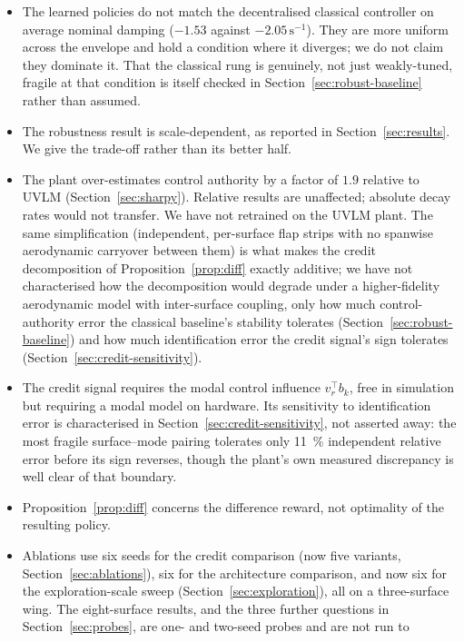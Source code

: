 \documentclass[preprint,11pt,authoryear]{elsarticle}
\begin{document}
\begin{itemize}
\item The learned policies do not match the decentralised classical controller on
average nominal damping ($-1.53$ against $-2.05\,\mathrm{s}^{-1}$). They are more
uniform across the envelope and hold a condition where it diverges; we do not
claim they dominate it. That the classical rung is genuinely, not just
weakly-tuned, fragile at that condition is itself checked in
Section~\ref{sec:robust-baseline} rather than assumed.
\item The robustness result is scale-dependent, as reported in
Section~\ref{sec:results}. We give the trade-off rather than its better half.
\item The plant over-estimates control authority by a factor of $1.9$ relative to
UVLM (Section~\ref{sec:sharpy}). Relative results are unaffected; absolute decay
rates would not transfer. We have not retrained on the UVLM plant. The same
simplification (independent, per-surface flap strips with no spanwise
aerodynamic carryover between them) is what makes the credit decomposition of
Proposition~\ref{prop:diff} exactly additive; we have not characterised how the
decomposition would degrade under a higher-fidelity aerodynamic model with
inter-surface coupling, only how much control-authority error the classical
baseline's stability tolerates (Section~\ref{sec:robust-baseline}) and how much
identification error the credit signal's sign tolerates
(Section~\ref{sec:credit-sensitivity}).
\item The credit signal requires the modal control influence $v_r^{\top} b_k$,
free in simulation but requiring a modal model on hardware. Its sensitivity to
identification error is characterised in Section~\ref{sec:credit-sensitivity},
not asserted away: the most fragile surface--mode pairing tolerates only
\SI{11}{\percent} independent relative error before its sign reverses, though
the plant's own measured discrepancy is well clear of that boundary.
\item Proposition~\ref{prop:diff} concerns the difference reward, not optimality
of the resulting policy.
\item Ablations use six seeds for the credit comparison (now five variants,
Section~\ref{sec:ablations}), six for the architecture comparison, and now six
for the exploration-scale sweep (Section~\ref{sec:exploration}), all on a
three-surface wing. The eight-surface results, and the three further questions
in Section~\ref{sec:probes}, are one- and two-seed probes and are not run to

\end{itemize}
\end{document}

